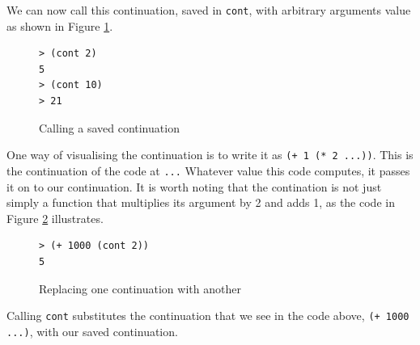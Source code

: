 \documentclass[11pt]{report}
\begin{document}
We can now call this continuation, saved in \texttt{cont}, with arbitrary arguments value as shown in Figure \ref{contcc3}.
\begin{figure}[ht]
\begin{lstlisting}
> (cont 2)
5
> (cont 10)
> 21
\end{lstlisting}
\caption{Calling a saved continuation}
\label{contcc3}
\end{figure}

One way of visualising the continuation is to write it as \texttt{(+ 1 (* 2 ...))}. This is the continuation of the code at \texttt{...} Whatever value this code computes, it passes it on to our continuation. It is worth noting that the contination is not just simply a function that multiplies its argument by 2 and adds 1, as the code in Figure \ref{contcc4} illustrates.
\begin{figure}[ht]
\begin{lstlisting}
> (+ 1000 (cont 2))
5
\end{lstlisting}
\caption{Replacing one continuation with another}
\label{contcc4}
\end{figure}

Calling \texttt{cont} substitutes the continuation that we see in the code above, \texttt{(+ 1000 ...)}, with our saved continuation.
\end{document}

